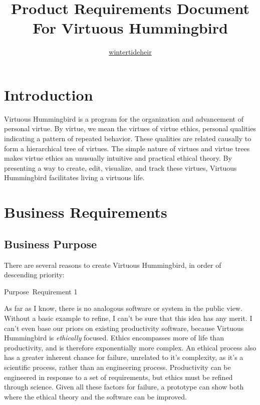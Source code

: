\documentclass{article}
\title{Product Requirements Document \\ \vspace{1mm} \normalsize For Virtuous Hummingbird}
\author{\href{https://github.com/wintertideheir}{wintertideheir}}
\date{}
\newcommand{\requirementname}{Undefined}
\newcommand{\requirementlabel}{undefined}
\newcommand{\setreqtype}[2]
    {
        \renewcommand{\requirementname}{#1}
        \renewcommand{\requirementlabel}{#2}
    }
\newenvironment{requirement}[1]
    {
        \begin{mdframed}
        \label{\requirementlabel-#1}
        \vspace{2.5mm}
        \begin{center}
            {\large \requirementname\ Requirement #1}
        \end{center}
        \vspace{2.5mm}
    }
    {
        \end{mdframed}
    }
\begin{document}
\maketitle
\tableofcontents

\section{Introduction}

Virtuous Hummingbird is a program for the organization and advancement of personal virtue.
By virtue, we mean the virtues of virtue ethics, personal qualities indicating a pattern of repeated behavior.
These qualities are related causally to form a hierarchical tree of virtues. 
The simple nature of virtues and virtue trees makes virtue ethics an unusually intuitive and practical ethical theory.
By presenting a way to create, edit, visualize, and track these virtues, Virtuous Hummingbird facilitates living a virtuous life.

\section{Business Requirements}

\subsection{Business Purpose}
\setreqtype{Purpose}{purpose}

There are several reasons to create Virtuous Hummingbird, in order of descending priority:

\begin{requirement}{1}
    As far as I know, there is no analogous software or system in the public view.
    Without a basic example to refine, I can't be sure that this idea has any merit.
    I can't even base our priors on existing productivity software, because Virtuous Hummingbird is \textit{ethically} focused.
    Ethics encompasses more of life than productivity, and is therefore exponentially more complex.
    An ethical process also has a greater inherent chance for failure, unrelated to it's complexity, as it's a scientific process, rather than an engineering process.
    Productivity can be engineered in response to a set of requirements, but ethics must be refined through science.
    Given all these factors for failure, a prototype can show both where the ethical theory and the software can be improved.
\end{requirement}
\end{document}
